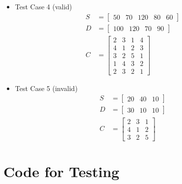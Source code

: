 \documentclass{article}
\begin{document}
\begin{itemize}
    \item Test Case 4 (valid)
          \begin{align*}
              S & = \begin{bmatrix} 50 & 70 & 120 & 80 & 60 \end{bmatrix} \\
              D & = \begin{bmatrix} 100 & 120 & 70 & 90 \end{bmatrix}     \\
              C & = \begin{bmatrix}
                        2 & 3 & 1 & 4 \\
                        4 & 1 & 2 & 3 \\
                        3 & 2 & 5 & 1 \\
                        1 & 4 & 3 & 2 \\
                        2 & 3 & 2 & 1
                    \end{bmatrix}
          \end{align*}

    \item Test Case 5 (invalid)
          \begin{align*}
              S & = \begin{bmatrix} 20 & 40 & 10 \end{bmatrix} \\
              D & = \begin{bmatrix} 30 & 10 & 10 \end{bmatrix} \\
              C & = \begin{bmatrix}
                        2 & 3 & 1 \\
                        4 & 1 & 2 \\
                        3 & 2 & 5
                    \end{bmatrix}
          \end{align*}
\end{itemize}

\section{Code for Testing}
\end{document}
